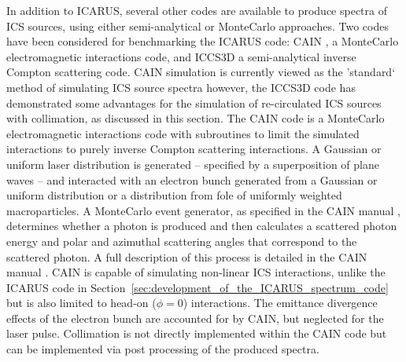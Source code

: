 \documentclass[../main.tex]{subfiles}
\begin{document}
In addition to \textsc{ICARUS}, several other codes are available to produce spectra of ICS sources, using either semi-analytical or MonteCarlo approaches. Two codes have been considered for benchmarking the \textsc{ICARUS} code: \textsc{CAIN} \cite{chen1995cain}, a MonteCarlo electromagnetic interactions code, and \textsc{ICCS3D} a semi-analytical inverse Compton scattering code. \textsc{CAIN} simulation is currently viewed as the 'standard` method of simulating ICS source spectra however, the \textsc{ICCS3D} code has demonstrated some advantages for the simulation of re-circulated ICS sources with collimation, as discussed in this section. 
The \textsc{CAIN} code is a MonteCarlo electromagnetic interactions code with subroutines to limit the simulated interactions to purely inverse Compton scattering interactions. A Gaussian or uniform laser distribution is generated -- specified by a superposition of plane waves -- and interacted with an electron bunch generated from a Gaussian or uniform distribution or a distribution from fole of uniformly weighted macroparticles. A MonteCarlo event generator, as specified in the \textsc{CAIN} manual \cite{yokoya2003users}, determines whether a photon is produced and then calculates a scattered photon energy and polar and azimuthal scattering angles that correspond to the scattered photon. A full description of this process is detailed in the \textsc{CAIN} manual \cite{yokoya2003users}. \textsc{CAIN} is capable of simulating non-linear ICS interactions, unlike the \textsc{ICARUS} code in Section~\ref{sec:development_of_the_ICARUS_spectrum_code} but is also limited to head-on ($\phi=0$) interactions. The emittance divergence effects of the electron bunch are accounted for by \textsc{CAIN}, but neglected for the laser pulse. Collimation is not directly implemented within the \textsc{CAIN} code but can be implemented via post processing of the produced spectra. 
\end{document}
